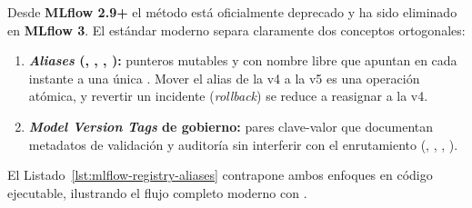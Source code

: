 \begin{modernbox}
 Desde \textbf{MLflow 2.9+} el método  está oficialmente deprecado y ha sido eliminado en \textbf{MLflow 3}. El estándar moderno separa claramente dos conceptos ortogonales:
\begin{enumerate}
  \item \textbf{\textit{Aliases} (, , , ):} punteros mutables y con nombre libre que apuntan en cada instante a una única . Mover el alias  de la v4 a la v5 es una operación atómica, y revertir un incidente (\textit{rollback}) se reduce a reasignar  a la v4.
  \item \textbf{\textit{Model Version Tags} de gobierno:} pares clave-valor que documentan metadatos de validación y auditoría sin interferir con el enrutamiento (, , , ).
\end{enumerate}
\end{modernbox}

El Listado~\ref{lst:mlflow-registry-aliases} contrapone ambos enfoques en código ejecutable, ilustrando el flujo completo moderno con .

